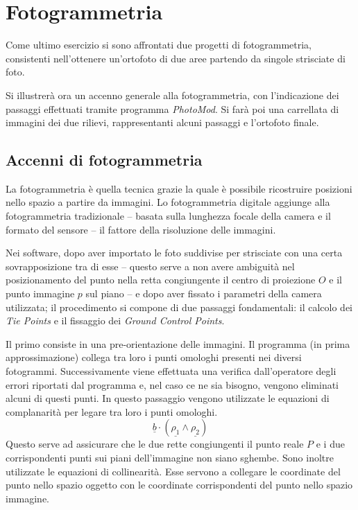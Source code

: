 \chapter{Fotogrammetria}
Come ultimo esercizio si sono affrontati due progetti di fotogrammetria, consistenti nell'ottenere un'ortofoto di due aree partendo da singole strisciate di foto.

Si illustrerà ora un accenno generale alla fotogrammetria, con l'indicazione dei passaggi effettuati tramite programma \emph{PhotoMod}. 
Si farà poi una carrellata di immagini dei due rilievi, rappresentanti alcuni passaggi e l'ortofoto finale. 

\section{Accenni di fotogrammetria}
La fotogrammetria è quella tecnica grazie la quale è possibile ricostruire posizioni nello spazio a partire da immagini.
Lo fotogrammetria digitale aggiunge alla fotogrammetria tradizionale -- basata sulla lunghezza focale della camera e il formato del sensore -- il fattore della risoluzione delle immagini.

Nei software, dopo aver importato le foto suddivise per strisciate con una certa sovrapposizione tra di esse -- questo serve a non avere ambiguità nel posizionamento del punto nella retta congiungente il centro di proiezione $O$ e il punto immagine $p$ sul piano -- e dopo aver fissato i parametri della camera utilizzata; il procedimento si compone di due passaggi fondamentali: il calcolo dei \textit{Tie Points} e il fissaggio dei \textit{Ground Control Points}.

Il primo consiste in una pre-orientazione delle immagini. 
Il programma (in prima approssimazione) collega tra loro i punti omologhi presenti nei diversi fotogrammi.
Successivamente viene effettuata una verifica dall'operatore degli errori riportati dal programma e, nel caso ce ne sia bisogno, vengono eliminati alcuni di questi punti.
In questo passaggio vengono utilizzate le equazioni di complanarità per legare tra loro i punti omologhi. 
\begin{equation}
	\underline{b}\cdot\left(\underline{\rho_1}\wedge\underline{\rho_2}\right)
\end{equation}
Questo serve ad assicurare che le due rette congiungenti il punto reale $P$ e i due corrispondenti punti sui piani dell'immagine non siano sghembe.
Sono inoltre utilizzate le equazioni di collinearità. 
Esse servono a collegare le coordinate del punto nello spazio oggetto con le coordinate corrispondenti del punto nello spazio immagine.
 

